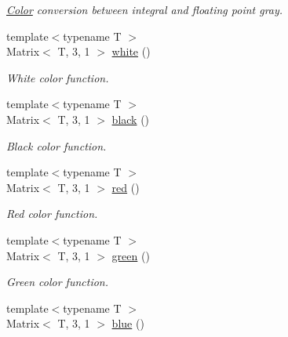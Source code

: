 \begin{DoxyCompactItemize}
\begin{DoxyCompactList}\small\item\em \hyperlink{class_d_o_1_1_color}{Color} conversion between integral and floating point gray. \end{DoxyCompactList}\item 
\hypertarget{group___primary_colors_gadc4ed12abc0d5a541d12226cb1b4aff3}{{\footnotesize template$<$typename T $>$ }\\Matrix$<$ T, 3, 1 $>$ \hyperlink{group___primary_colors_gadc4ed12abc0d5a541d12226cb1b4aff3}{white} ()}\label{group___primary_colors_gadc4ed12abc0d5a541d12226cb1b4aff3}

\begin{DoxyCompactList}\small\item\em White color function. \end{DoxyCompactList}\item 
\hypertarget{group___primary_colors_ga80b0871f1549bb1f83903fc572b0b6ef}{{\footnotesize template$<$typename T $>$ }\\Matrix$<$ T, 3, 1 $>$ \hyperlink{group___primary_colors_ga80b0871f1549bb1f83903fc572b0b6ef}{black} ()}\label{group___primary_colors_ga80b0871f1549bb1f83903fc572b0b6ef}

\begin{DoxyCompactList}\small\item\em Black color function. \end{DoxyCompactList}\item 
\hypertarget{group___primary_colors_gab84f59703c6ed9af4ad0a3a22fbc7dde}{{\footnotesize template$<$typename T $>$ }\\Matrix$<$ T, 3, 1 $>$ \hyperlink{group___primary_colors_gab84f59703c6ed9af4ad0a3a22fbc7dde}{red} ()}\label{group___primary_colors_gab84f59703c6ed9af4ad0a3a22fbc7dde}

\begin{DoxyCompactList}\small\item\em Red color function. \end{DoxyCompactList}\item 
\hypertarget{group___primary_colors_ga3636f495be874a77dcb70d98f6601abc}{{\footnotesize template$<$typename T $>$ }\\Matrix$<$ T, 3, 1 $>$ \hyperlink{group___primary_colors_ga3636f495be874a77dcb70d98f6601abc}{green} ()}\label{group___primary_colors_ga3636f495be874a77dcb70d98f6601abc}

\begin{DoxyCompactList}\small\item\em Green color function. \end{DoxyCompactList}\item 
\hypertarget{group___primary_colors_ga854c3a582fd097c73469f89b73e63915}{{\footnotesize template$<$typename T $>$ }\\Matrix$<$ T, 3, 1 $>$ \hyperlink{group___primary_colors_ga854c3a582fd097c73469f89b73e63915}{blue} ()}\label{group___primary_colors_ga854c3a582fd097c73469f89b73e63915}


\end{DoxyCompactItemize}
